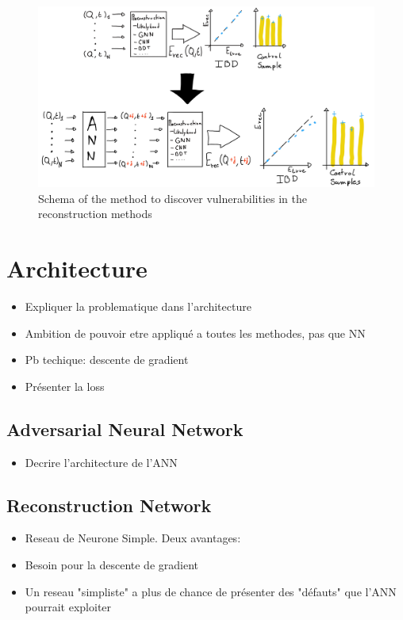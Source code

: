 \documentclass[../main.tex]{subfiles}
\begin{document}
\begin{figure}[ht]
  \centering
  \includegraphics[width=\linewidth]{images/janne/ann_method.jpg}
  \caption{Schema of the method to discover vulnerabilities in the reconstruction methods}
  \label{fig:janne:method:schema}
\end{figure}


\section{Architecture}
\label{sec:janne:arch}
\begin{itemize}
  \item Expliquer la problematique dans l'architecture
  \item Ambition de pouvoir etre appliqué a toutes les methodes, pas que NN
  \item Pb techique: descente de gradient
  \item Présenter la loss
\end{itemize}

\subsection{Adversarial Neural Network}
\label{sec:janne:arch:ann}
\begin{itemize}
  \item Decrire l'architecture de l'ANN
\end{itemize}

\subsection{Reconstruction Network}
\label{sec:janne:arch:reco}
\begin{itemize}
  \item Reseau de Neurone Simple. Deux avantages:
  \item Besoin pour la descente de gradient
  \item Un reseau "simpliste" a plus de chance de présenter des "défauts" que l'ANN pourrait exploiter
\end{itemize}
\end{document}
